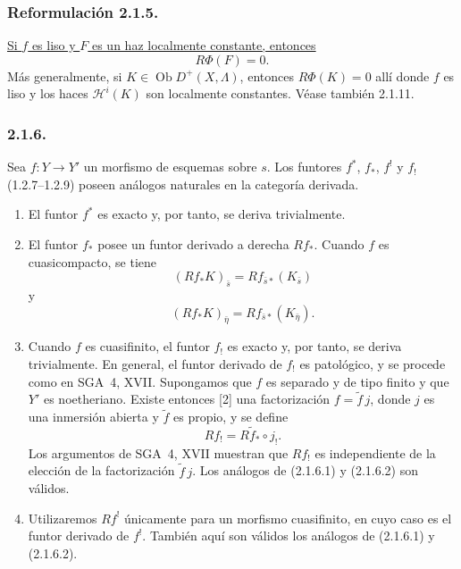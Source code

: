\subsubsection*{Reformulación 2.1.5.}
\underline{Si $f$ es liso y $F$ es un haz localmente constante, entonces}
\begin{equation*}
R\Phi(F)=0.
\end{equation*}
Más generalmente, si $K\in\operatorname{Ob}D^+(X,\Lambda)$, entonces
$R\Phi(K)=0$ allí donde $f$ es liso y los haces $\mathcal H^i(K)$ son
localmente constantes. Véase también 2.1.11.

\subsubsection*{2.1.6.}
Sea $f:Y\longrightarrow Y'$ un morfismo de esquemas sobre $s$. Los funtores
$f^*$, $f_*$, $f^!$ y $f_!$ (1.2.7--1.2.9) poseen análogos naturales en la
categoría derivada.
\begin{enumerate}[label=\alph*)]
\item El funtor $f^*$ es exacto y, por tanto, se deriva trivialmente.

\pageoriginale

\item El funtor $f_*$ posee un funtor derivado a derecha $Rf_*$. Cuando $f$
es cuasicompacto, se tiene
\begin{equation}\tag{2.1.6.1}
(Rf_*K)_{\bar s}=Rf_{\bar s*}(K_{\bar s})
\end{equation}
y
\begin{equation}\tag{2.1.6.2}
(Rf_*K)_{\bar\eta}=Rf_{\bar s*}(K_{\bar\eta}).
\end{equation}

\item Cuando $f$ es cuasifinito, el funtor $f_!$ es exacto y, por tanto, se
deriva trivialmente. En general, el funtor derivado de $f_!$ es patológico, y
se procede como en SGA~4, XVII. Supongamos que $f$ es separado y de tipo
finito y que $Y'$ es noetheriano. Existe entonces [2] una factorización
$f=\widetilde f\,j$, donde $j$ es una inmersión abierta y $\widetilde f$ es
propio, y se define
\begin{equation*}
Rf_!=R\widetilde f_*\circ j_!.
\end{equation*}
Los argumentos de SGA~4, XVII muestran que $Rf_!$ es independiente de la
elección de la factorización $\widetilde f\,j$. Los análogos de (2.1.6.1) y
(2.1.6.2) son válidos.

\item Utilizaremos $Rf^!$ únicamente para un morfismo cuasifinito, en cuyo
caso es el funtor derivado de $f^!$. También aquí son válidos los análogos de
(2.1.6.1) y (2.1.6.2).
\end{enumerate}

